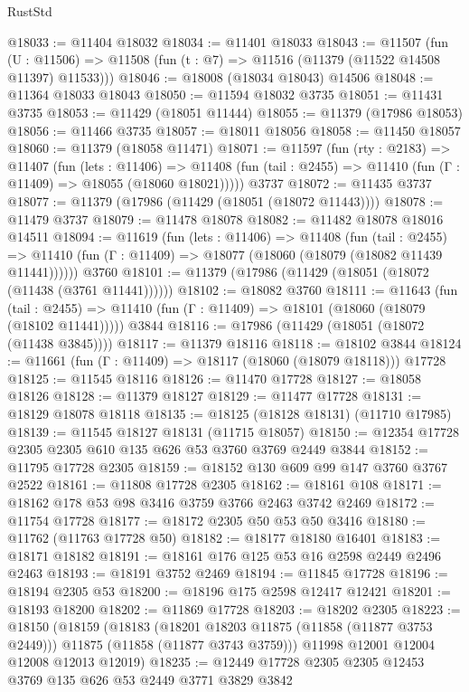 \begin{lexlean}{RustStd}
\begin{coremodule}
@18033 := @11404 @18032
@18034 := @11401 @18033
@18043 := @11507
    (fun (U : @11506) => @11508 (fun (t : @7) => @11516 (@11379 (@11522 @14508 @11397) @11533)))
@18046 := @18008 (@18034 @18043) @14506
@18048 := @11364 @18033 @18043
@18050 := @11594 @18032 @3735
@18051 := @11431 @3735
@18053 := @11429 (@18051 @11444)
@18055 := @11379 (@17986 @18053)
@18056 := @11466 @3735
@18057 := @18011 @18056
@18058 := @11450 @18057
@18060 := @11379 (@18058 @11471)
@18071 := @11597
    (fun (rty : @2183) =>
    @11407
      (fun (lets : @11406) =>
      @11408 (fun (tail : @2455) => @11410 (fun (Γ : @11409) => @18055 (@18060 @18021)))))
    @3737
@18072 := @11435 @3737
@18077 := @11379 (@17986 (@11429 (@18051 (@18072 @11443))))
@18078 := @11479 @3737
@18079 := @11478 @18078
@18082 := @11482 @18078 @18016 @14511
@18094 := @11619
    (fun (lets : @11406) =>
    @11408
      (fun (tail : @2455) =>
      @11410 (fun (Γ : @11409) => @18077 (@18060 (@18079 (@18082 @11439 @11441))))))
    @3760
@18101 := @11379 (@17986 (@11429 (@18051 (@18072 (@11438 (@3761 @11441))))))
@18102 := @18082 @3760
@18111 := @11643
    (fun (tail : @2455) => @11410 (fun (Γ : @11409) => @18101 (@18060 (@18079 (@18102 @11441)))))
    @3844
@18116 := @17986 (@11429 (@18051 (@18072 (@11438 @3845))))
@18117 := @11379 @18116
@18118 := @18102 @3844
@18124 := @11661 (fun (Γ : @11409) => @18117 (@18060 (@18079 @18118))) @17728
@18125 := @11545 @18116
@18126 := @11470 @17728
@18127 := @18058 @18126
@18128 := @11379 @18127
@18129 := @11477 @17728
@18131 := @18129 @18078 @18118
@18135 := @18125 (@18128 @18131) (@11710 @17985)
@18139 := @11545 @18127 @18131 (@11715 @18057)
@18150 := @12354 @17728 @2305 @2305 @610 @135 @626 @53 @3760 @3769 @2449 @3844
@18152 := @11795 @17728 @2305
@18159 := @18152 @130 @609 @99 @147 @3760 @3767 @2522
@18161 := @11808 @17728 @2305
@18162 := @18161 @108
@18171 := @18162 @178 @53 @98 @3416 @3759 @3766 @2463 @3742 @2469
@18172 := @11754 @17728
@18177 := @18172 @2305 @50 @53 @50 @3416
@18180 := @11762 (@11763 @17728 @50)
@18182 := @18177 @18180 @16401
@18183 := @18171 @18182
@18191 := @18161 @176 @125 @53 @16 @2598 @2449 @2496 @2463
@18193 := @18191 @3752 @2469
@18194 := @11845 @17728
@18196 := @18194 @2305 @53
@18200 := @18196 @175 @2598 @12417 @12421
@18201 := @18193 @18200
@18202 := @11869 @17728
@18203 := @18202 @2305
@18223 := @18150
    (@18159
      (@18183
        (@18201 @18203 @11875 (@11858 (@11877 @3753 @2449)))
        @11875
        (@11858 (@11877 @3743 @3759)))
      @11998
      @12001
      @12004
      @12008
      @12013
      @12019)
@18235 := @12449 @17728 @2305 @2305 @12453 @3769 @135 @626 @53 @2449 @3771 @3829 @3842

\end{coremodule}
\end{lexlean}
